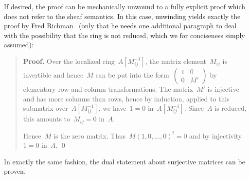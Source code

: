 \documentclass{ws-rv9x6}
\renewcommand{\_}{\mathpunct{.}}
\newcommand{\?}{\,{:}\,}
\begin{document}
If desired, the proof can be mechanically unwound to a fully explicit proof
which does not refer to the sheaf semantics. In this case, unwinding yields
exactly the proof by Fred Richman~\cite[Theorem~2]{richman:trivial-rings} (only
that he needs one additional paragraph to deal with the possibility that the
ring is not reduced, which we for conciseness simply assumed):

\begin{quote}
\textbf{Proof.} Over the localized
ring~$A[M_{ij}^{-1}]$, the matrix element~$M_{ij}$ is invertible and hence~$M$ can be
put into the form~$\left(\begin{smallmatrix}1&0\\0&M'\end{smallmatrix}\right)$
by elementary row and column transformations. The matrix~$M'$ is injective and
has more columns than rows, hence by induction, applied to this submatrix
over~$A[M_{ij}^{-1}]$, we have~$1 = 0$ in~$A[M_{ij}^{-1}]$. Since~$A$ is
reduced, this amounts to~$M_{ij} = 0$ in~$A$.

Hence~$M$ is the zero matrix. Thus~$M(1,0,\ldots,0)^t = 0$ and by
injectivity~$1 = 0$ in~$A$. \qed
\end{quote}

In exactly the same fashion, the dual statement about surjective matrices can
be proven.
\end{document}
